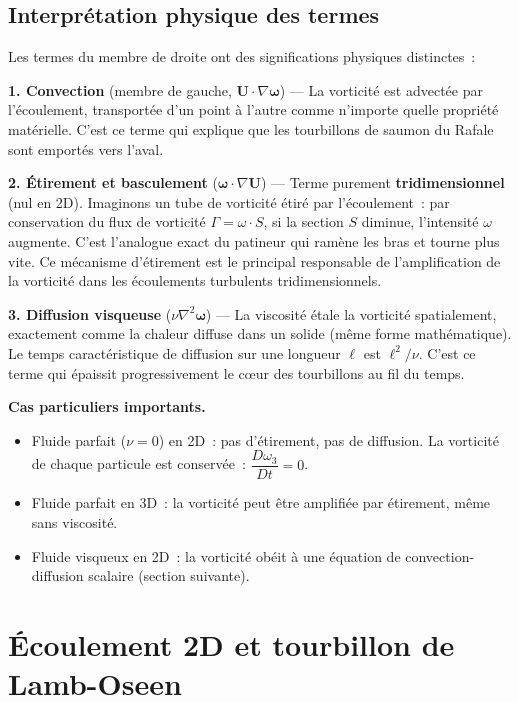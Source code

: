 \documentclass[11pt,a4paper]{report}
\newcommand{\DD}[1]{\dfrac{D #1}{Dt}}
\begin{document}
\subsection{Interpr\'etation physique des termes}

Les termes du membre de droite ont des significations physiques distinctes~:

\medskip
\noindent\textbf{1. Convection} (membre de gauche, $\bm{U}\cdot\nabla\boldsymbol{\omega}$)
--- La vorticit\'e est advect\'ee par l'\'ecoulement, transport\'ee d'un point \`a l'autre
comme n'importe quelle propri\'et\'e mat\'erielle. C'est ce terme qui explique que les
tourbillons de saumon du Rafale sont emport\'es vers l'aval.

\medskip
\noindent\textbf{2. \'Etirement et basculement} ($\boldsymbol{\omega}\cdot\nabla\bm{U}$)
--- Terme purement \textbf{tridimensionnel} (nul en 2D). Imaginons un tube de vorticit\'e
\'etir\'e par l'\'ecoulement~: par conservation du flux de vorticit\'e $\Gamma = \omega\cdot S$,
si la section $S$ diminue, l'intensit\'e $\omega$ augmente. C'est l'analogue exact du
patineur qui ram\`ene les bras et tourne plus vite. Ce m\'ecanisme d'\'etirement est
le principal responsable de l'amplification de la vorticit\'e dans les \'ecoulements
turbulents tridimensionnels.

\medskip
\noindent\textbf{3. Diffusion visqueuse} ($\nu\nabla^2\boldsymbol{\omega}$) --- La viscosit\'e
\'etale la vorticit\'e spatialement, exactement comme la chaleur diffuse dans un solide
(m\^eme forme math\'ematique). Le temps caract\'eristique de diffusion sur une longueur
$\ell$ est $\ell^2/\nu$. C'est ce terme qui \'epaissit progressivement le c\oe ur des
tourbillons au fil du temps.

\medskip
\noindent\textbf{Cas particuliers importants.}
\begin{itemize}
  \item Fluide parfait ($\nu=0$) en 2D~: pas d'\'etirement, pas de diffusion.
    La vorticit\'e de chaque particule est conserv\'ee~: $\DD{\omega_3} = 0$.
  \item Fluide parfait en 3D~: la vorticit\'e peut \^etre amplifi\'ee par \'etirement,
    m\^eme sans viscosit\'e.
  \item Fluide visqueux en 2D~: la vorticit\'e ob\'eit \`a une \'equation de
    convection-diffusion scalaire (section suivante).
\end{itemize}

\section{\'Ecoulement 2D et tourbillon de Lamb-Oseen}
\end{document}
